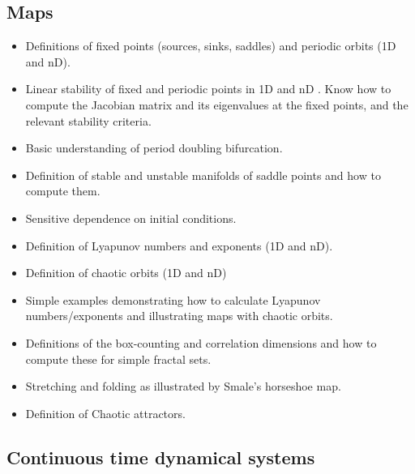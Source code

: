 \documentclass[
  a4paper,
  oneside,
  final]{krantz}
\providecommand{\tightlist}{%
  \setlength{\itemsep}{0pt}\setlength{\parskip}{0pt}}
\theoremstyle{definition}
\theoremstyle{definition}
\theoremstyle{definition}
\theoremstyle{definition}
\theoremstyle{remark}
\begin{document}
\hypertarget{maps}{%
\subsection*{Maps}\label{maps}}


\begin{itemize}
\tightlist
\item
  Definitions of fixed points (sources, sinks, saddles) and periodic orbits (1D and nD).
\item
  Linear stability of fixed and periodic points in 1D and nD . Know how to compute the Jacobian matrix and its eigenvalues at the fixed points, and the relevant stability criteria.
\item
  Basic understanding of period doubling bifurcation.
\item
  Definition of stable and unstable manifolds of saddle points and how to compute them.
\item
  Sensitive dependence on initial conditions.
\item
  Definition of Lyapunov numbers and exponents (1D and nD).
\item
  Definition of chaotic orbits (1D and nD)
\item
  Simple examples demonstrating how to calculate Lyapunov numbers/exponents and illustrating maps with chaotic orbits.
\item
  Definitions of the box-counting and correlation dimensions and how to compute these for simple fractal sets.
\item
  Stretching and folding as illustrated by Smale's horseshoe map.
\item
  Definition of Chaotic attractors.
\end{itemize}

\hypertarget{continuous-time-dynamical-systems-1}{%
\subsection*{Continuous time dynamical systems}\label{continuous-time-dynamical-systems-1}}
\end{document}
